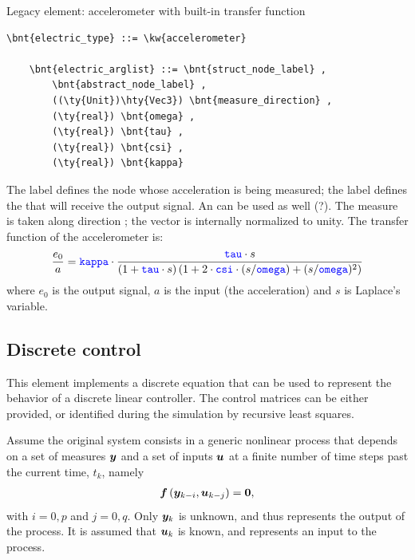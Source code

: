 \noindent
Legacy element: accelerometer with built-in transfer function
\begin{Verbatim}[commandchars=\\\{\}]
    \bnt{electric_type} ::= \kw{accelerometer}

    \bnt{electric_arglist} ::= \bnt{struct_node_label} ,
        \bnt{abstract_node_label} ,
        ((\ty{Unit})\hty{Vec3}) \bnt{measure_direction} ,
        (\ty{real}) \bnt{omega} ,
        (\ty{real}) \bnt{tau} ,
        (\ty{real}) \bnt{csi} ,
        (\ty{real}) \bnt{kappa}	
\end{Verbatim}
The label  defines the node whose acceleration 
is being measured; the label  defines the
 that will receive the output signal. 
An  can be used as well (?).
The measure is taken along direction ;
the vector is internally normalized to unity.
The transfer function of the accelerometer is:
\begin{displaymath}
    \frac{e_0}{a} = \textcolor{blue}{\texttt{kappa}} \cdot \frac{\textcolor{blue}{\texttt{tau}} \cdot s}{
        \left( 1 + \textcolor{blue}{\texttt{tau}} \cdot s \right)
        \left( 1 + 2 \cdot \textcolor{blue}{\texttt{csi}} \cdot (s/\textcolor{blue}{\texttt{omega}}) + (s/\textcolor{blue}{\texttt{omega}})^2 \right)
    }
\end{displaymath}
where $ e_0 $ is the output signal, $ a $ is the input (the acceleration)
and $ s $ is Laplace's variable.



\subsection{Discrete control}\label{sec:EL:DISCCTRL}
This element implements a discrete equation
that can be used to represent the behavior
of a discrete linear controller.
The control matrices can be either provided,
or identified during the simulation by recursive least squares.

Assume the original system consists in a generic nonlinear process
that depends on a set of measures $\boldsymbol{y}$ and a set of inputs $\boldsymbol{u}$
at a finite number of time steps past the current time, $t_k$, namely
\begin{align}
	\boldsymbol{f}\left( \boldsymbol{y}_{k - i}, \boldsymbol{u}_{k - j} \right) = \boldsymbol{0} ,
\end{align}
with $i=0,p$ and $j=0,q$.
Only $\boldsymbol{y}_k$ is unknown, and thus represents the output of the process.
It is assumed that $\boldsymbol{u}_k$ is known, and represents an input
to the process.

